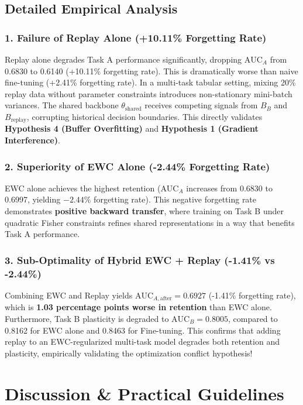 \documentclass{article}
\begin{document}
\subsection{Detailed Empirical Analysis}

\subsubsection{1. Failure of Replay Alone (+10.11\% Forgetting Rate)}
Replay alone degrades Task A performance significantly, dropping $\text{AUC}_A$ from 0.6830 to 0.6140 (+10.11\% forgetting rate). This is dramatically worse than naive fine-tuning (+2.41\% forgetting rate). In a multi-task tabular setting, mixing 20\% replay data without parameter constraints introduces non-stationary mini-batch variances. The shared backbone $\theta_{\text{shared}}$ receives competing signals from $B_B$ and $B_{\text{replay}}$, corrupting historical decision boundaries. This directly validates \textbf{Hypothesis 4 (Buffer Overfitting)} and \textbf{Hypothesis 1 (Gradient Interference)}.

\subsubsection{2. Superiority of EWC Alone (-2.44\% Forgetting Rate)}
EWC alone achieves the highest retention ($\text{AUC}_A$ increases from 0.6830 to 0.6997, yielding $-2.44\%$ forgetting rate). This negative forgetting rate demonstrates \textbf{positive backward transfer}, where training on Task B under quadratic Fisher constraints refines shared representations in a way that benefits Task A performance.

\subsubsection{3. Sub-Optimality of Hybrid EWC + Replay (-1.41\% vs -2.44\%)}
Combining EWC and Replay yields $\text{AUC}_{A,\text{after}} = 0.6927$ (-1.41\% forgetting rate), which is \textbf{1.03 percentage points worse in retention} than EWC alone. Furthermore, Task B plasticity is degraded to $\text{AUC}_B = 0.8005$, compared to 0.8162 for EWC alone and 0.8463 for Fine-tuning. This confirms that adding replay to an EWC-regularized multi-task model degrades both retention and plasticity, empirically validating the optimization conflict hypothesis!

\section{Discussion \& Practical Guidelines}
\end{document}

